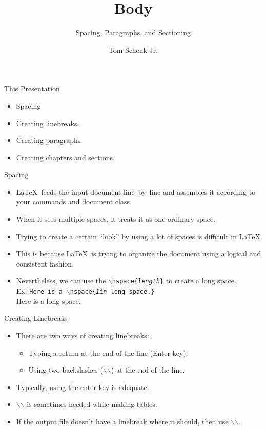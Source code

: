 \documentclass[pdf]{prosper}
\title{Body}
\subtitle{Spacing, Paragraphs, and Sectioning}
\author{Tom Schenk Jr.}
\begin{document}
\maketitle
\begin{slide}{This Presentation}
	\begin{itemize}
		\item Spacing
		\item Creating linebreaks.
		\item Creating paragraphs
		\item Creating chapters and sections.
	\end{itemize}
\end{slide}
\begin{slide}{Spacing}
	\begin{itemize}
		\item \LaTeX\ feeds the input document line--by--line and assembles it according to your commands and document class.
		\item When it sees multiple spaces, it treats it as one ordinary space.
		\item Trying to create a certain ``look'' by using a lot of spaces is difficult in \LaTeX.
		\item This is because \LaTeX\ is trying to organize the document using a logical and consistent fashion.
		\item Nevertheless, we can use the \texttt{$\backslash$hspace\{\textit{length}\}} to create a long space.	\\
		Ex: \texttt{Here is a \texttt{$\backslash$hspace\{\textit{1in} long space.\}}} \\
		Here is a \hspace{1in} long space. \\
	\end{itemize}
\end{slide}
\begin{slide}{Creating Linebreaks}
	\begin{itemize}
		\item There are two ways of creating linebreaks:
			\begin{itemize}
				\item Typing a return at the end of the line (Enter key).
				\item Using two backslashes ($\backslash$$\backslash$) at the end of the line.
			\end{itemize}
		\item Typically, using the enter key is adequate.
		\item $\backslash$$\backslash$ is sometimes needed while making tables.
		\item If the output file doesn't have a linebreak where it should, then use $\backslash$$\backslash$.
	\end{itemize}
\end{slide}
\end{document}
